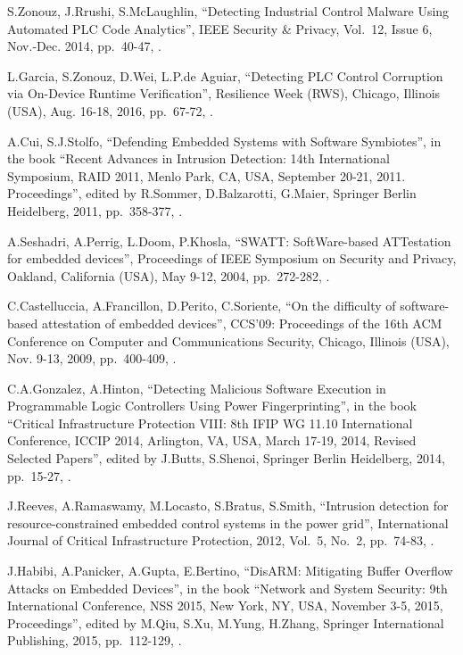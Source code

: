 \begin{thebibliography}{99}
S.Zonouz, J.Rrushi, S.McLaughlin,
``Detecting Industrial Control Malware Using Automated PLC Code Analytics'',
IEEE Security \& Privacy,
Vol.\ 12, Issue 6,
Nov.-Dec. 2014,
pp.\ 40-47,
.

L.Garcia, S.Zonouz, D.Wei, L.P.de Aguiar,
``Detecting PLC Control Corruption via On-Device Runtime Verification'',
Resilience Week (RWS),
Chicago, Illinois (USA), Aug. 16-18, 2016,
pp.\ 67-72,
.

A.Cui, S.J.Stolfo,
``Defending Embedded Systems with Software Symbiotes'',
in the book ``Recent Advances in Intrusion Detection: 14th International Symposium, RAID 2011, Menlo Park, CA, USA, September 20-21, 2011. Proceedings'',
edited by R.Sommer, D.Balzarotti, G.Maier,
Springer Berlin Heidelberg, 2011,
pp.\ 358-377,
.

A.Seshadri, A.Perrig, L.Doom, P.Khosla,
``SWATT: SoftWare-based ATTestation for embedded devices'',
Proceedings of IEEE Symposium on Security and Privacy,
Oakland, California (USA), May 9-12, 2004,
pp.\ 272-282,
.

C.Castelluccia, A.Francillon, D.Perito, C.Soriente,
``On the difficulty of software-based attestation of embedded devices'',
CCS'09: Proceedings of the 16th ACM Conference on Computer and Communications Security,
Chicago, Illinois (USA), Nov. 9-13, 2009,
pp.\ 400-409,
.

C.A.Gonzalez, A.Hinton,
``Detecting Malicious Software Execution in Programmable Logic Controllers Using Power Fingerprinting'',
in the book ``Critical Infrastructure Protection VIII: 8th IFIP WG 11.10 International Conference, ICCIP 2014, Arlington, VA, USA, March 17-19, 2014, Revised Selected Papers'',
edited by J.Butts, S.Shenoi,
Springer Berlin Heidelberg, 2014,
pp.\ 15-27,
.

J.Reeves, A.Ramaswamy, M.Locasto, S.Bratus, S.Smith,
``Intrusion detection for resource-constrained embedded control systems in the power grid'',
International Journal of Critical Infrastructure Protection, 2012,
Vol.\ 5, No.\ 2,
pp.\ 74-83,
.

J.Habibi, A.Panicker, A.Gupta, E.Bertino,
``DisARM: Mitigating Buffer Overflow Attacks on Embedded Devices'',
in the book ``Network and System Security: 9th International Conference, NSS 2015, New York, NY, USA, November 3-5, 2015, Proceedings'',
edited by M.Qiu, S.Xu, M.Yung, H.Zhang,
Springer International Publishing, 2015,
pp.\ 112-129,
.


\end{thebibliography}
